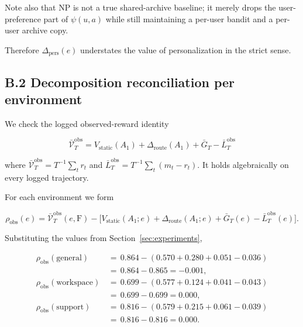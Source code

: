 \documentclass{article} %
\begin{document}
Note also that NP is not a true shared-archive baseline; it merely drops the user-preference part of $\psi(u,a)$ while still maintaining a per-user bandit and a per-user archive copy.

Therefore $\Delta_{\mathrm{pers}}(e)$ understates the value of personalization in the strict sense.

\subsection{B.2 Decomposition reconciliation per environment}

\label{app:decomp-reconcile}

We check the logged observed-reward identity

\begin{equation}
\label{eq:app-identity-recall}
\bar{\mathcal{V}}_T^{\mathrm{obs}}
= V_{\mathrm{static}}(A_1)
+ \Delta_{\mathrm{route}}(A_1)
+ \bar{G}_T
- \bar{L}_T^{\mathrm{obs}}
\end{equation}

where
\(\bar{\mathcal V}_T^{\mathrm{obs}}=T^{-1}\sum_t r_t\) and
\(\bar L_T^{\mathrm{obs}}=T^{-1}\sum_t(m_t-r_t)\). It holds algebraically on
every logged trajectory.

For each environment we form

\begin{equation}
\label{eq:app-residual}
\rho_{\mathrm{obs}}(e)
= \bar{\mathcal{V}}_T^{\mathrm{obs}}(e,\mathrm{F})
- \big[V_{\mathrm{static}}(A_1;e)
+ \Delta_{\mathrm{route}}(A_1;e)
+ \bar{G}_T(e)
- \bar{L}_T^{\mathrm{obs}}(e)\big].
\end{equation}

Substituting the values from Section~\ref{sec:experiments},

\begin{equation}
\label{eq:app-residual-num}
\begin{aligned}
\rho_{\mathrm{obs}}(\mathrm{general})  &\,=\, 0.864 - (0.570 + 0.280 + 0.051 - 0.036)\\
                        &\,=\, 0.864 - 0.865 = -0.001,\\
\rho_{\mathrm{obs}}(\mathrm{workspace})&\,=\, 0.699 - (0.577 + 0.124 + 0.041 - 0.043)\\
                        &\,=\, 0.699 - 0.699 = 0.000,\\
\rho_{\mathrm{obs}}(\mathrm{support})  &\,=\, 0.816 - (0.579 + 0.215 + 0.061 - 0.039)\\
                        &\,=\, 0.816 - 0.816 = 0.000.
\end{aligned}
\end{equation}
\end{document}
